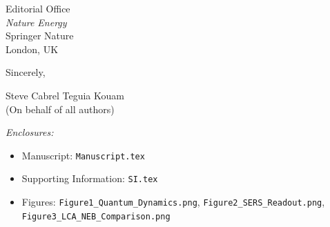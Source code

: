 \documentclass[12pt]{letter}
\begin{document}
\begin{letter}{Editorial Office\\
\textit{Nature Energy}\\
Springer Nature\\
London, UK}
\closing{Sincerely,}

\vspace{1em}

Steve Cabrel Teguia Kouam\\
(On behalf of all authors)

\vspace{1em}
\textit{Enclosures:}
\begin{itemize}
\item Manuscript: \texttt{Manuscript.tex}
\item Supporting Information: \texttt{SI.tex}
\item Figures: \texttt{Figure1\_Quantum\_Dynamics.png}, \texttt{Figure2\_SERS\_Readout.png}, \texttt{Figure3\_LCA\_NEB\_Comparison.png}
\end{itemize}

\end{letter}
\end{document}
